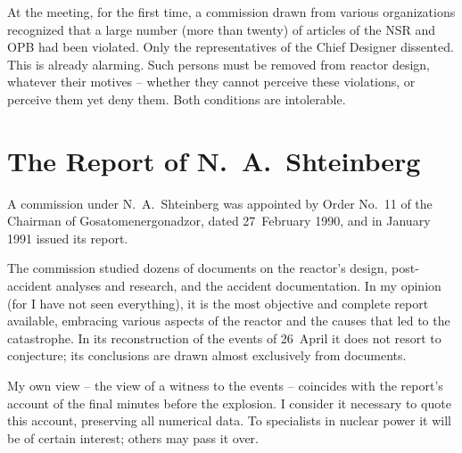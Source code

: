 \documentclass[openright]{bookest}
\begin{document}
At the meeting, for the first time, a commission drawn from various organizations recognized that a large number (more than twenty) of articles of the NSR and OPB had been violated. Only the representatives of the Chief Designer dissented. This is already alarming. Such persons must be removed from reactor design, whatever their motives -- whether they cannot perceive these violations, or perceive them yet deny them. Both conditions are intolerable.

\section{The Report of N.~A.~Shteinberg}

A commission under N.~A.~Shteinberg was appointed by Order No.~11 of the Chairman of Gosatomenergonadzor, dated 27~February 1990, and in January 1991 issued its report.

The commission studied dozens of documents on the reactor's design, post-accident analyses and research, and the accident documentation. In my opinion (for I have not seen everything), it is the most objective and complete report available, embracing various aspects of the reactor and the causes that led to the catastrophe. In its reconstruction of the events of 26~April it does not resort to conjecture; its conclusions are drawn almost exclusively from documents.

My own view -- the view of a witness to the events -- coincides with the report's account of the final minutes before the explosion. I consider it necessary to quote this account, preserving all numerical data. To specialists in nuclear power it will be of certain interest; others may pass it over.
\end{document}
